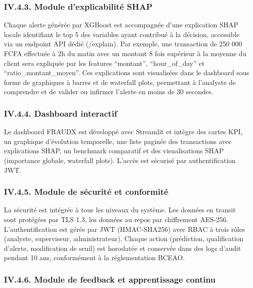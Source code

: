 \documentclass[
  12pt,
]{article}
\begin{document}
\subsubsection{IV.4.3. Module d’explicabilité
SHAP}\label{iv.4.3.-module-dexplicabilituxe9-shap}

Chaque alerte générée par XGBoost est accompagnée d’une explication SHAP
locale identifiant le top 5 des variables ayant contribué à la décision,
accessible via un endpoint API dédié (/explain). Par exemple, une
transaction de 250 000 FCFA effectuée à 2h du matin avec un montant 8
fois supérieur à la moyenne du client sera expliquée par les features
“montant”, “hour\_of\_day” et “ratio\_montant\_moyen”. Ces explications
sont visualisées dans le dashboard sous forme de graphiques à barres et
de waterfall plots, permettant à l’analyste de comprendre et de valider
ou infirmer l’alerte en moins de 30 secondes.

\subsubsection{IV.4.4. Dashboard
interactif}\label{iv.4.4.-dashboard-interactif}

Le dashboard FRAUDX est développé avec Streamlit et intègre des cartes
KPI, un graphique d’évolution temporelle, une liste paginée des
transactions avec explications SHAP, un benchmark comparatif et des
visualisations SHAP (importance globale, waterfall plots). L’accès est
sécurisé par authentification JWT.

\subsubsection{IV.4.5. Module de sécurité et
conformité}\label{iv.4.5.-module-de-suxe9curituxe9-et-conformituxe9}

La sécurité est intégrée à tous les niveaux du système. Les données en
transit sont protégées par TLS 1.3, les données au repos par chiffrement
AES-256. L’authentification est gérée par JWT (HMAC-SHA256) avec RBAC à
trois rôles (analyste, superviseur, administrateur). Chaque action
(prédiction, qualification d’alerte, modification de seuil) est
horodatée et conservée dans des logs d’audit pendant 10 ans,
conformément à la réglementation BCEAO.

\subsubsection{IV.4.6. Module de feedback et apprentissage
continu}\label{iv.4.6.-module-de-feedback-et-apprentissage-continu}
\end{document}
